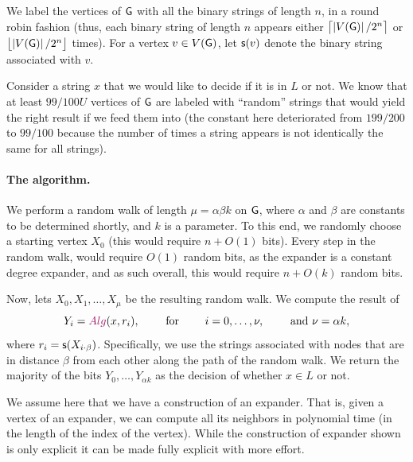 We label the vertices of $\mathsf{G}$ with all the binary strings of
length $n$, in a round robin fashion (thus, each binary string of
length $n$ appears either
\begin{math}
    \left\lceil { \bigl. \left| {V(\mathsf{G})} \right| / 2^n } \right\rceil
\end{math}
or
\begin{math}
    \left\lfloor { \bigl. \left| {V(\mathsf{G})} \right| / 2^n } \right\rfloor
\end{math}
times). For a vertex $v \in \VerticesX{\Graph}$, let $\StringX{v}$
denote the binary string associated with $v$.

Consider a string $x$ that we would like to decide if it is in $L$ or
not. We know that at least $99/100 U$ vertices of $\mathsf{G}$ are labeled
with ``random'' strings that would yield the right result if we feed
them into \Alg (the constant here deteriorated from $199/200$ to
$99/100$ because the number of times a string appears is not
identically the same for all strings).

\paragraph*{The algorithm.}
We perform a random walk of length $\mu = \alpha \beta k$ on $\mathsf{G}$,
where $\alpha$ and $\beta$ are constants to be determined shortly, and
$k$ is a parameter. To this end, we randomly choose a starting vertex
$X_0$ (this would require $n+O(1)$ bits). Every step in the random
walk, would require $O(1)$ random bits, as the expander is a constant
degree expander, and as such overall, this would require $n + O(k)$
random bits.

Now, lets $X_0, X_1, \ldots, X_\mu$ be the resulting random walk. We
compute the result of
\begin{equation*}
    Y_i = \Alg\pth{x, r_i}, %
    \qquad \text{ for } \qquad i=0,\ldots, \altK, \qquad \text{
       and } \altK = \alpha k,
\end{equation*}
where $r_i = \StringX{X_{i\cdot \beta }}$.  Specifically, we use the
strings associated with nodes that are in distance $\beta$ from each
other along the path of the random walk.  We return the majority of
the bits $Y_0, \ldots, Y_{\alpha k}$ as the decision of whether $x \in
L$ or not.

We assume here that we have a  construction of
an expander. That is, given a vertex of an expander, we can compute
all its neighbors in polynomial time (in the length of the index of
the vertex). While the construction of expander shown is only explicit
it can be made fully explicit with more effort.


